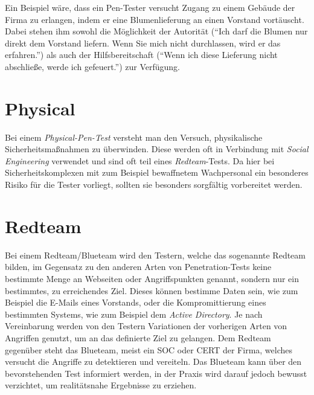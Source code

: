 Ein Beispiel wäre, dass ein Pen-Tester versucht Zugang zu einem Gebäude der Firma zu erlangen, indem er eine Blumenlieferung an einen Vorstand vortäuscht. Dabei stehen ihm sowohl die Möglichkeit der Autorität ("`Ich darf die Blumen nur direkt dem Vorstand liefern. Wenn Sie mich nicht durchlassen, wird er das erfahren."') als auch der Hilfsbereitschaft ("`Wenn ich diese Lieferung nicht abschließe, werde ich gefeuert."') zur Verfügung.

	\section{Physical}
	Bei einem \textit{Physical-Pen-Test} versteht man den Versuch, physikalische Sicherheitsmaßnahmen zu überwinden. Diese werden oft in Verbindung mit \textit{Social Engineering} verwendet und sind oft teil eines \textit{Redteam}-Tests. Da hier bei Sicherheitskomplexen mit zum Beispiel bewaffnetem Wachpersonal ein besonderes Risiko für die Tester vorliegt, sollten sie besonders sorgfältig vorbereitet werden.

	\section{Redteam}
	Bei einem Redteam/Blueteam wird den Testern, welche das sogenannte Redteam bilden, im Gegensatz zu den anderen Arten von Penetration-Tests keine bestimmte Menge an Webseiten oder Angriffspunkten genannt, sondern nur ein bestimmtes, zu erreichendes Ziel. Dieses können bestimme Daten sein, wie zum Beispiel die E-Mails eines Vorstands, oder die Kompromittierung eines bestimmten Systems, wie zum Beispiel dem \textit{Active Directory}. Je nach Vereinbarung werden von den Testern Variationen der vorherigen Arten von Angriffen genutzt, um an das definierte Ziel zu gelangen. Dem Redteam gegenüber steht das Blueteam, meist ein SOC oder CERT der Firma, welches versucht die Angriffe zu detektieren und vereiteln. Das Blueteam kann über den bevorstehenden Test informiert werden, in der Praxis wird darauf jedoch bewusst verzichtet, um realitätsnahe Ergebnisse zu erziehen.\\
	

	
	
	
	
	